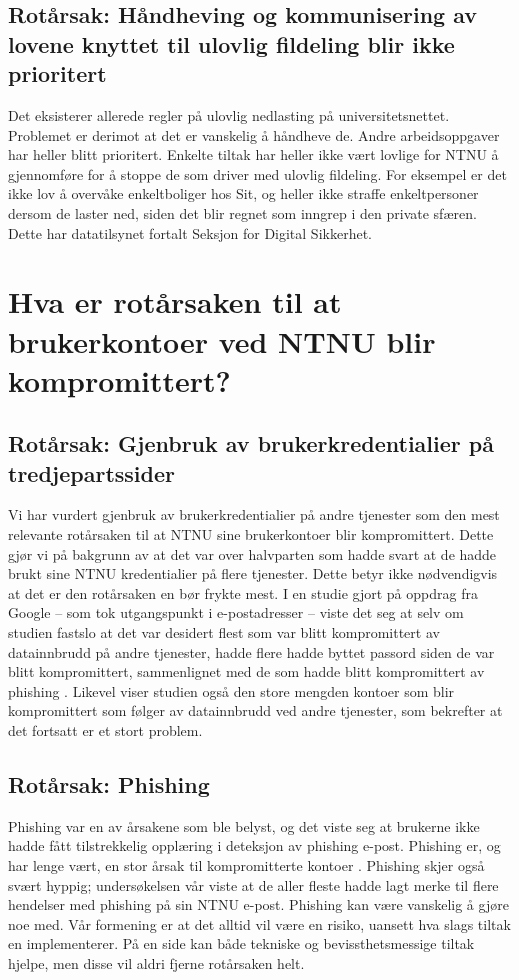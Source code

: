 \subsection*{Rotårsak: Håndheving og kommunisering av lovene knyttet til ulovlig fildeling blir ikke prioritert}
Det eksisterer allerede regler på ulovlig nedlasting på universitetsnettet. Problemet er derimot at det er vanskelig å håndheve de. Andre arbeidsoppgaver har heller blitt prioritert. Enkelte tiltak har heller ikke vært lovlige for NTNU å gjennomføre for å stoppe de som driver med ulovlig fildeling. For eksempel er det ikke lov å overvåke enkeltboliger hos Sit, og heller ikke straffe enkeltpersoner dersom de laster ned, siden det blir regnet som inngrep i den private sfæren. Dette har datatilsynet fortalt Seksjon for Digital Sikkerhet. 


\section{Hva er rotårsaken til at brukerkontoer ved NTNU blir kompromittert?}

\subsection*{Rotårsak: Gjenbruk av brukerkredentialier på tredjepartssider}
Vi har vurdert gjenbruk av brukerkredentialier på andre tjenester som den mest relevante rotårsaken til at NTNU sine brukerkontoer blir kompromittert. Dette gjør vi på bakgrunn av at det var over halvparten som hadde svart at de hadde brukt sine NTNU kredentialier på flere tjenester. Dette betyr ikke nødvendigvis at det er den rotårsaken en bør frykte mest. I en studie gjort på oppdrag fra Google – som tok utgangspunkt i e-postadresser – viste det seg at selv om studien fastslo at det var desidert flest som var blitt kompromittert av datainnbrudd på andre tjenester, hadde flere hadde byttet passord siden de var blitt kompromittert, sammenlignet med de som hadde blitt kompromittert av phishing \cite{46437}. Likevel viser studien også den store mengden kontoer som blir kompromittert som følger av datainnbrudd ved andre tjenester, som bekrefter at det fortsatt er et stort problem. 

\subsection*{Rotårsak: Phishing}
Phishing var en av årsakene som ble belyst, og det viste seg at brukerne ikke hadde fått tilstrekkelig opplæring i deteksjon av phishing e-post. Phishing er, og har lenge vært, en stor årsak til kompromitterte kontoer \cite{SophPhish}. Phishing skjer også svært hyppig; undersøkelsen vår viste at de aller fleste hadde lagt merke til flere hendelser med phishing på sin NTNU e-post. Phishing kan være vanskelig å gjøre noe med. Vår formening er at det alltid vil være en risiko, uansett hva slags tiltak en implementerer. På en side kan både tekniske og bevissthetsmessige tiltak hjelpe, men disse vil aldri fjerne rotårsaken helt. 

